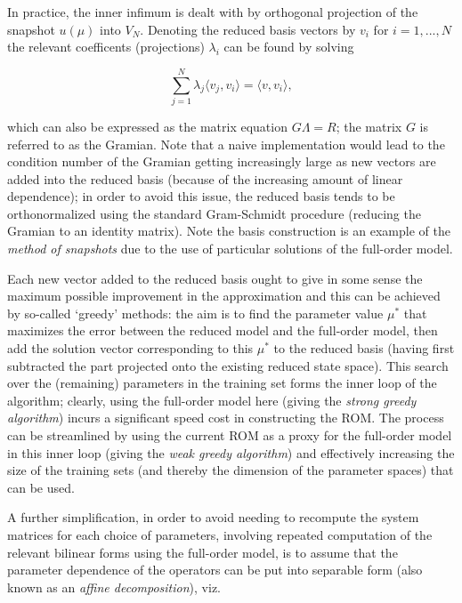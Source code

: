 In practice, the inner infimum is dealt with by orthogonal projection of the snapshot $u(\mu)$ into $V_N$.  
Denoting the reduced basis vectors by $v_i$ for $i=1, ..., N$ the relevant coefficents (projections) $\lambda_i$ can be found by solving 

\begin{equation}
\sum_{j=1}^{N} \lambda_j \langle v_j, v_i \rangle = \langle v, v_i \rangle,
\end{equation}

which can also be expressed as the matrix equation $G \Lambda = R$; the matrix $G$ is referred to as the Gramian.  
Note that a naive implementation would lead to the condition number of the Gramian getting increasingly large as new vectors are added into the reduced basis (because of the increasing amount of linear dependence); in order to avoid this issue, the reduced basis tends to be orthonormalized using the standard Gram-Schmidt procedure (reducing the Gramian to an identity matrix).  
Note the basis construction is an example of the {\it method of snapshots} due to the use of particular solutions of the full-order model.

Each new vector added to the reduced basis ought to give in some sense the maximum possible improvement in the approximation and this can be achieved by so-called `greedy' methods: the aim is to find the parameter value $\mu^*$ that maximizes the error between the reduced model and the full-order model, then add the solution vector corresponding to this $\mu^*$ to the reduced basis (having first subtracted the part projected onto the existing reduced state space).  
This search over the (remaining) parameters in the training set forms the inner loop of the algorithm; clearly, using the full-order model here (giving the {\it strong greedy algorithm}) incurs a significant speed cost in constructing the ROM.  
The process can be streamlined by using the current ROM as a proxy for the full-order model in this inner loop (giving the {\it weak greedy algorithm}) and effectively increasing the size of the training sets (and thereby the dimension of the parameter spaces) that can be used.

A further simplification, in order to avoid needing to recompute the system matrices for each choice of parameters, involving repeated computation of the relevant bilinear forms using the full-order model, is to assume that the parameter dependence of the operators can be put into separable form (also known as an {\it affine decomposition}), viz.

